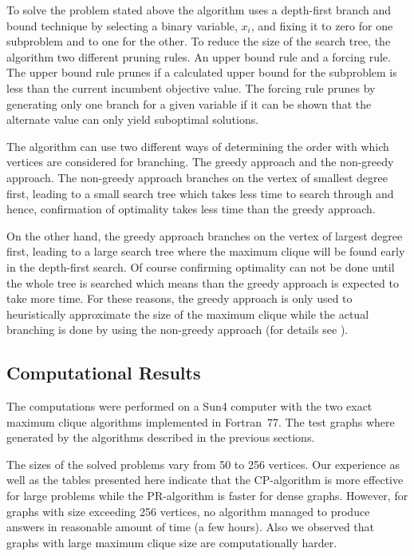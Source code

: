 To solve the problem stated above the algorithm uses a depth-first
branch and bound technique by selecting a binary variable, $x_{i}$, and
fixing it to zero for one subproblem and to one for the other.
To reduce the size of the search tree, the
algorithm two different pruning rules. An upper bound rule and a forcing rule.
The upper bound rule prunes if a calculated upper bound for the subproblem is
less than the current incumbent objective value.
The forcing rule prunes by generating only one branch for a given
variable if it can be shown that the alternate value can only yield
suboptimal solutions.

The algorithm can use two different ways of determining the order with
which vertices are considered for branching. The greedy approach and
the non-greedy approach. The non-greedy approach branches on the
vertex of smallest degree first, leading to a small search tree which
takes less time to search through and hence, confirmation of
optimality takes less time than the greedy approach.

On the other hand, the greedy approach branches on the vertex of largest degree
first, leading to a large search tree where the maximum clique will be found
early in the depth-first search. Of course confirming optimality can not be done
until the whole tree is searched which means than the greedy approach is
expected to take more time. For these reasons, the greedy approach is only used
to heuristically approximate the size of the maximum clique while the actual
branching is done by using the non-greedy approach (for details see \cite{PR}).

\subsection{Computational Results}

The computations were performed on a Sun4 computer with the two exact
maximum clique algorithms implemented in Fortran~77. The test graphs
where generated by the algorithms described in the previous sections.

The sizes of the solved problems vary from 50 to 256 vertices. Our experience
as well as the tables presented here indicate that the CP-algorithm is more
effective
for large problems while the PR-algorithm is faster for dense graphs. However,
for graphs with size exceeding 256 vertices, no algorithm managed to produce
answers in reasonable amount of time (a few hours). Also we observed that
graphs with large maximum clique size are computationally harder.


